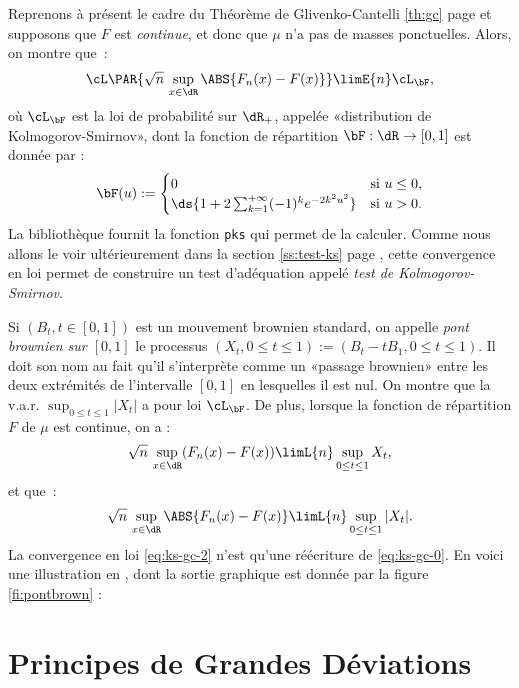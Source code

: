 Reprenons à présent le cadre du Théorème de Glivenko-Cantelli \ref{th:gc} page
\pageref{th:gc} et supposons que $F$ est \emph{continue}, et donc que $\mu$
n'a pas de masses ponctuelles. Alors, on montre que~:
\begin{equation}\label{eq:ks-gc-0}
\cL\PAR{\sqrt{n}\,\sup_{x \in \dR}\ABS{F_n(x)-F(x)}} \limE{n} \cL_{\bF},
\end{equation}
où $\cL_{\bF}$ est la loi de probabilité sur $\dR_+$, appelée «distribution de
Kolmogorov-Smirnov», dont la fonction de répartition $\bF:\dR\to[0,1]$ est
donnée par :
\begin{equation}\label{eq:def-ks-distrib}
\bF(u):=
\begin{cases}
  0 & \text{si } u\leq0,\\
  \ds{1+2 \sum_{k=1}^{+\infty} (-1)^k e^{-2k^2u^2}} & \text{si } u>0.
\end{cases}
\end{equation}
La bibliothèque \SB{} fournit la fonction \ML{} \texttt{pks} qui permet de
la calculer. Comme nous allons le voir ultérieurement dans la section
\ref{ss:test-ks} page \pageref{ss:test-ks}, cette convergence en loi permet de
construire un test d'adéquation appelé \emph{test de Kolmogorov-Smirnov}.

Si $(B_t,t\in[0,1])$ est un mouvement brownien standard, on appelle \emph{pont
  brownien sur $[0,1]$} le processus $(X_t,0\leq t\leq 1):=(B_t-tB_1,0\leq
t\leq 1)$. Il doit son nom au fait qu'il s'interprète comme un «passage
brownien» entre les deux extrémités de l'intervalle $[0,1]$ en lesquelles il
est nul. On montre que la v.a.r. $\sup_{0\leq t\leq1}|X_t|$ a pour loi
$\cL_{\bF}$. De plus, lorsque la fonction de répartition $F$ de $\mu$ est
continue, on a :
\begin{equation}\label{eq:ks-gc-1}
\sqrt{n}\,\sup_{x \in \dR}(F_n(x)-F(x))\limL{n}\sup_{0\leq t\leq1}X_t,
\end{equation}
et que~:
\begin{equation}\label{eq:ks-gc-2}
\sqrt{n}\,\sup_{x \in \dR}\ABS{F_n(x)-F(x)}\limL{n}\sup_{0\leq t\leq1}|X_t|.
\end{equation}
La convergence en loi \eqref{eq:ks-gc-2} n'est qu'une réécriture de
\eqref{eq:ks-gc-0}. En voici une illustration en \ML, dont la sortie graphique
est donnée par la figure \ref{fi:pontbrown} :
%
%
%

%
\section{Principes de Grandes Déviations}\label{se:pgd}
%


